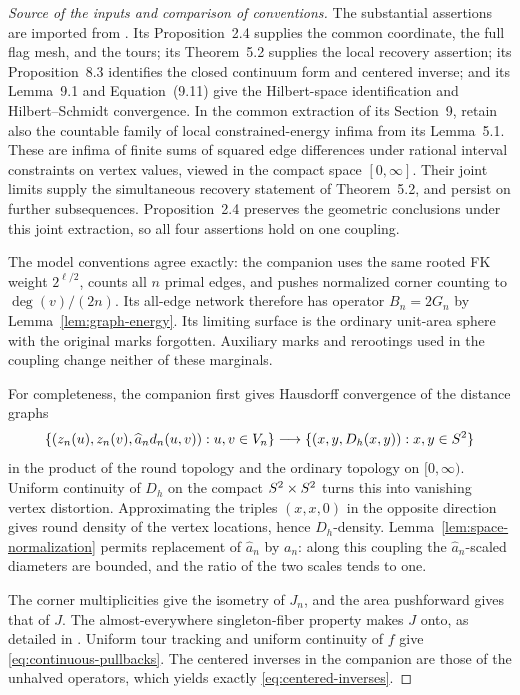 \begin{proof}[Source of the inputs and comparison of conventions]
The substantial assertions are imported from \cite{SC}.  Its
Proposition~2.4 supplies the common coordinate, the full flag mesh, and
the tours; its Theorem~5.2 supplies the local recovery assertion; its
Proposition~8.3 identifies the closed continuum form and centered inverse;
and its Lemma~9.1 and Equation~(9.11) give the Hilbert-space identification
and Hilbert--Schmidt convergence.  In the common extraction of its
Section~9, retain also the countable family of local constrained-energy
infima from its Lemma~5.1.  These are infima of finite sums of squared
edge differences under rational interval constraints on vertex values,
viewed in the compact space \([0,\infty]\).  Their joint limits supply
the simultaneous recovery statement of Theorem~5.2, and persist on
further subsequences.  Proposition~2.4 preserves the geometric
conclusions under this joint extraction, so all four assertions hold on
one coupling.

The model conventions agree exactly: the companion uses the same rooted
FK weight \(2^{\ell/2}\), counts all \(n\) primal edges, and pushes
normalized corner counting to \(\deg(v)/(2n)\).  Its all-edge network
therefore has operator \(B_n=2G_n\) by
Lemma~\ref{lem:graph-energy}.  Its limiting surface is the ordinary
unit-area sphere with the original marks forgotten.  Auxiliary marks and
rerootings used in the coupling change neither of these marginals.

For completeness, the companion first gives Hausdorff convergence of
the distance graphs
\[
 \{(z_n(u),z_n(v),\widehat a_nd_n(u,v)):u,v\in V_n\}
 \longrightarrow
 \{(x,y,D_h(x,y)):x,y\in S^2\}
\]
in the product of the round topology and the ordinary topology on
\([0,\infty)\).  Uniform continuity of \(D_h\) on the compact
\(S^2\times S^2\) turns this into vanishing vertex distortion.
Approximating the triples \((x,x,0)\) in the opposite direction gives
round density of the vertex locations, hence \(D_h\)-density.
Lemma~\ref{lem:space-normalization} permits replacement of
\(\widehat a_n\) by \(a_n\): along this coupling the
\(\widehat a_n\)-scaled diameters are bounded, and the ratio of the
two scales tends to one.

The corner multiplicities give the isometry of \(J_n\), and the area
pushforward gives that of \(J\).  The almost-everywhere singleton-fiber
property makes \(J\) onto, as detailed in \cite[Lemma~9.1]{SC}.
Uniform tour tracking and uniform continuity of \(f\) give
\eqref{eq:continuous-pullbacks}.  The centered inverses in the companion
are those of the unhalved operators, which yields exactly
\eqref{eq:centered-inverses}.


\end{proof}
